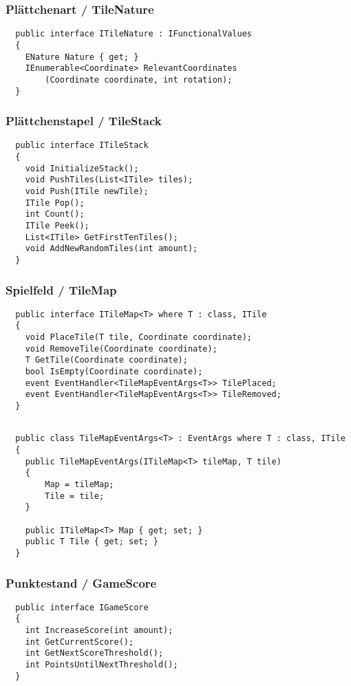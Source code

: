 \documentclass[../main.tex]{subfiles}
\begin{document}
	\subsubsection{Plättchenart / TileNature}
	\begin{lstlisting}
  public interface ITileNature : IFunctionalValues
  {
	ENature Nature { get; }
	IEnumerable<Coordinate> RelevantCoordinates
		(Coordinate coordinate, int rotation);
  }
	\end{lstlisting}

	\subsubsection{Plättchenstapel / TileStack}
	\begin{lstlisting}
  public interface ITileStack
  {
	void InitializeStack();
	void PushTiles(List<ITile> tiles);
	void Push(ITile newTile);
	ITile Pop();
	int Count();
	ITile Peek();
	List<ITile> GetFirstTenTiles();
	void AddNewRandomTiles(int amount);
  }
	\end{lstlisting}

	\subsubsection{Spielfeld / TileMap}
	\begin{lstlisting}
  public interface ITileMap<T> where T : class, ITile
  {
	void PlaceTile(T tile, Coordinate coordinate);
	void RemoveTile(Coordinate coordinate);
	T GetTile(Coordinate coordinate);
	bool IsEmpty(Coordinate coordinate);
	event EventHandler<TileMapEventArgs<T>> TilePlaced;
	event EventHandler<TileMapEventArgs<T>> TileRemoved;
  }
	

	\end{lstlisting}
	\begin{lstlisting}
  public class TileMapEventArgs<T> : EventArgs where T : class, ITile
  {
	public TileMapEventArgs(ITileMap<T> tileMap, T tile)
	{
		Map = tileMap;
		Tile = tile;
	}
	
	public ITileMap<T> Map { get; set; }
	public T Tile { get; set; }
  }
	\end{lstlisting}

	\subsubsection{Punktestand / GameScore}
	\begin{lstlisting}
  public interface IGameScore
  {
	int IncreaseScore(int amount);
	int GetCurrentScore();
	int GetNextScoreThreshold();
	int PointsUntilNextThreshold();
  }
	\end{lstlisting}
\end{document}
